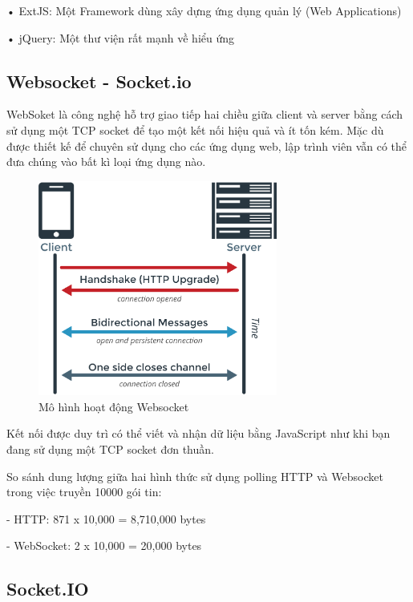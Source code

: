 • ExtJS: Một Framework dùng xây dựng ứng dụng quản lý (Web Applications)

• jQuery: Một thư viện rất mạnh về hiểu ứng

\subsection{Websocket - Socket.io}
WebSoket là công nghệ hỗ trợ giao tiếp hai chiều giữa client và server bằng cách sử dụng một TCP socket để tạo một kết nối hiệu quả và ít tốn kém. Mặc dù được thiết kế để chuyên sử dụng cho các ứng dụng web, lập trình viên vẫn có thể đưa chúng vào bất kì loại ứng dụng nào.\cite{c2wk}
\begin{figure}[H]
	\centering    
	\includegraphics[width=0.7\textwidth]{websk}
	\caption[Mô hình hoạt động Websocket]{Mô hình hoạt động Websocket\cite{c2wk2}} 
	\label{fig: websk}
\end{figure}

Kết nối được duy trì có thể viết và nhận dữ liệu bằng JavaScript như khi bạn đang sử dụng một TCP socket đơn thuần.

So sánh dung lượng giữa hai hình thức sử dụng polling HTTP và Websocket trong việc truyền 10000 gói tin:

- HTTP: 871 x 10,000 = 8,710,000 bytes

- WebSocket: 2 x 10,000 = 20,000 bytes



\subsection{Socket.IO}

